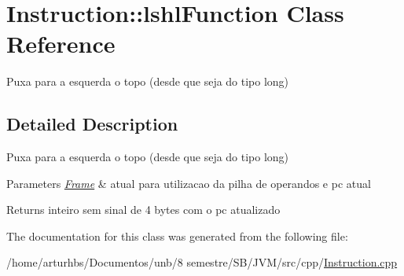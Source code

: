 \hypertarget{classInstruction_1_1lshlFunction}{}\section{Instruction\+:\+:lshl\+Function Class Reference}
\label{classInstruction_1_1lshlFunction}


Puxa para a esquerda o topo (desde que seja do tipo long)  




\subsection{Detailed Description}
Puxa para a esquerda o topo (desde que seja do tipo long) 


\begin{DoxyParams}{Parameters}
{\em \hyperlink{classFrame}{Frame}} & atual para utilizacao da pilha de operandos e pc atual \\
\hline
\end{DoxyParams}
\begin{DoxyReturn}{Returns}
inteiro sem sinal de 4 bytes com o pc atualizado 
\end{DoxyReturn}


The documentation for this class was generated from the following file\+:\begin{DoxyCompactItemize}
\item 
/home/arturhbs/\+Documentos/unb/8 semestre/\+S\+B/\+J\+V\+M/src/cpp/\hyperlink{Instruction_8cpp}{Instruction.\+cpp}\end{DoxyCompactItemize}
